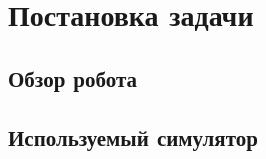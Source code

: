 \chapter{Постановка задачи}\label{ch:ch1}
\section{Обзор робота}\label{sec:ch1/sec1}
\section{Используемый симулятор}\label{sec:ch1/sec1}
